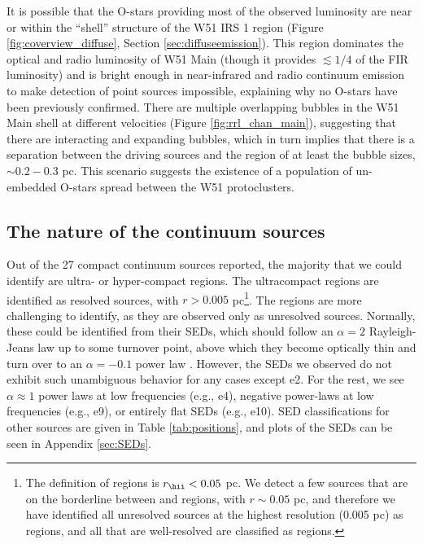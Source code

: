 It is possible that the O-stars providing most of the observed
luminosity are near or within the ``shell'' structure of the W51 IRS 1 region
(Figure \ref{fig:coverview_diffuse}, Section \ref{sec:diffuseemission}).  This
region dominates the optical and radio luminosity of W51 Main (though it
provides $\lesssim 1/4$ of the FIR luminosity) and is bright enough in
near-infrared and radio continuum emission to make detection of point sources
impossible, explaining why no O-stars have been previously confirmed.  There
are multiple overlapping \hii bubbles in the W51 Main shell at different
velocities (Figure \ref{fig:rrl_chan_main}), suggesting that there are
interacting and  expanding bubbles, which in turn implies that there is a
separation between the driving sources and the \hii region of at least the
bubble sizes, $\sim0.2-0.3$ pc.  This scenario suggests the existence of a
population of un-embedded O-stars spread between the W51 protoclusters.

\subsection{The nature of the continuum sources}
\label{sec:contnature}

Out of the 27 compact continuum sources reported, the majority that we could
identify are ultra- or hyper-compact \hii regions.  The ultracompact \hii
regions are identified as resolved sources, with $r>0.005$
pc\footnote{The
\citet{Kurtz2002a} definition of \hchii regions is $r_{\hii}<0.05$ pc.  We
detect a few sources that are on the borderline between \hchii
and \uchii regions, with $r\sim0.05$ pc, and therefore we have identified all
unresolved sources at the highest resolution (0.005 pc) as \hchii regions, and
all that are well-resolved are classified as \uchii regions.}.  The \hchii
regions are more
challenging to identify, as they are observed only as unresolved sources.
Normally, these could be identified from their SEDs, which should follow an
$\alpha=2$ Rayleigh-Jeans law up to some turnover point, above which they 
become optically thin and turn over to an $\alpha={-0.1}$ power law
\citep{Wilson2009a}.  However, the SEDs we observed do not exhibit such unambiguous
behavior for any cases except e2.  For the rest, we see $\alpha\approx1$ power laws
at low frequencies (e.g., e4), negative power-laws at low frequencies (e.g.,
e9), or entirely flat SEDs (e.g., e10).  SED classifications for other sources
are given in Table \ref{tab:positions}, and plots of the SEDs can be seen in
Appendix \ref{sec:SEDs}.

